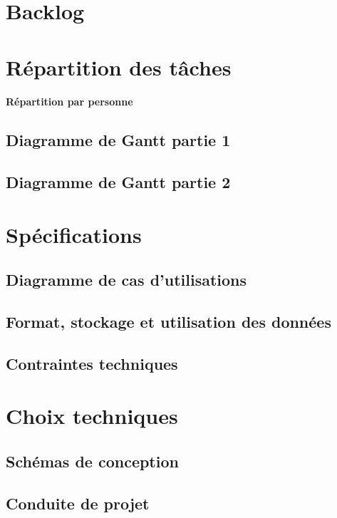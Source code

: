 \documentclass[
	headsepline=on,
	footsepline=on,
	twoside=off,
	abstract=on,
	DIV=10
]{scrreprt}
\begin{document}
		\section{Backlog}
		\section{Répartition des tâches}
			\paragraph{Répartition par personne}
		
			\subsection{Diagramme de Gantt partie 1}
			
			\subsection{Diagramme de Gantt partie 2}
		\section{Spécifications}
			\subsection{Diagramme de cas d'utilisations}
			
			\subsection{Format, stockage et utilisation des données}
			
			\subsection{Contraintes techniques}
		
		\section{Choix techniques}
			\subsection{Schémas de conception}
			
			\subsection{Conduite de projet}
			
\end{document}
